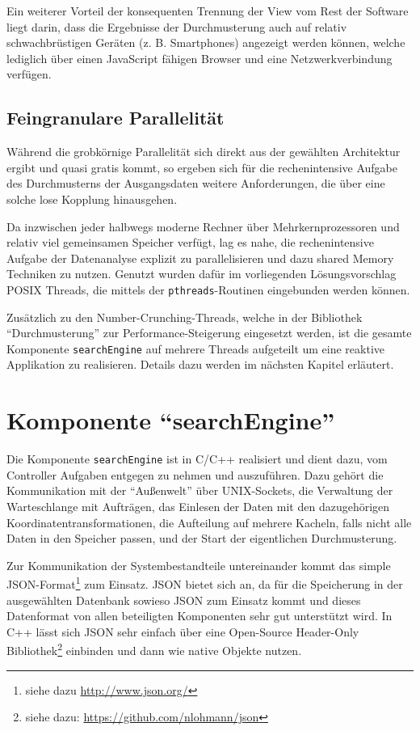 \documentclass[10pt,a4paper]{report}
\begin{document}
Ein weiterer Vorteil der konsequenten Trennung der View vom Rest der Software liegt darin, dass die Ergebnisse der Durchmusterung auch auf relativ schwachbrüstigen Geräten (z. B. Smartphones) angezeigt werden können, welche lediglich über einen JavaScript fähigen Browser und eine Netzwerkverbindung verfügen.

\section{Feingranulare Parallelität}

Während die grobkörnige Parallelität sich direkt aus der gewählten Architektur ergibt und quasi gratis kommt, so ergeben sich für die rechenintensive Aufgabe des Durchmusterns der Ausgangsdaten weitere Anforderungen, die über eine solche lose Kopplung hinausgehen.

Da inzwischen jeder halbwegs moderne Rechner über Mehrkernprozessoren und relativ viel gemeinsamen Speicher verfügt, lag es nahe, die rechenintensive Aufgabe der Datenanalyse explizit zu parallelisieren und dazu shared Memory Techniken zu nutzen. Genutzt wurden dafür im vorliegenden Lösungsvorschlag POSIX Threads, die mittels der \texttt{pthreads}-Routinen eingebunden werden können.

Zusätzlich zu den Number-Crunching-Threads, welche in der Bibliothek "`Durchmusterung"' zur Performance-Steigerung eingesetzt werden, ist die gesamte Komponente \texttt{searchEngine} auf mehrere Threads aufgeteilt um eine reaktive Applikation zu realisieren. Details dazu werden im nächsten Kapitel erläutert.


\chapter{Komponente "`searchEngine"'}

Die Komponente \texttt{searchEngine} ist in C/C++ realisiert und dient dazu, vom Controller Aufgaben entgegen zu nehmen und auszuführen. Dazu gehört die Kommunikation mit der "`Außenwelt"' über UNIX-Sockets, die Verwaltung der Warteschlange mit Aufträgen, das Einlesen der Daten mit den dazugehörigen Koordinatentransformationen, die Aufteilung auf mehrere Kacheln, falls nicht alle Daten in den Speicher passen, und der Start der eigentlichen Durchmusterung.

Zur Kommunikation der Systembestandteile untereinander kommt das simple JSON-Format\footnote{siehe dazu \url{http://www.json.org/}} zum Einsatz. JSON bietet sich an, da für die Speicherung in der ausgewählten Datenbank sowieso JSON zum Einsatz kommt und dieses Datenformat von allen beteiligten Komponenten sehr gut unterstützt wird. In C++ lässt sich JSON sehr einfach über eine Open-Source Header-Only Bibliothek\footnote{siehe dazu: \url{https://github.com/nlohmann/json}} einbinden und dann wie native Objekte nutzen.
\end{document}
